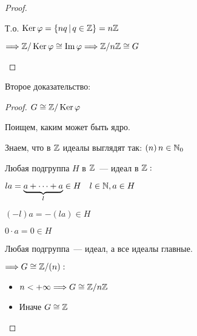 \begin{theorem-non}
\begin{proof}
\begin{enumerate}
            Т.о. $\operatorname{Ker} \varphi = \{ nq \, | \, q \in \mathbb{Z} \} = n \mathbb{Z}$

            $\Longrightarrow \mathbb{Z} / \operatorname{Ker} \varphi \cong \operatorname{Im} \varphi \Longrightarrow \mathbb{Z} / n \mathbb{Z} \cong G$
             
        \end{enumerate}
    \end{proof}

    Второе доказательство:
    \begin{proof}
        
        $G \cong \mathbb{Z} / \operatorname{Ker} \varphi$

        Поищем, каким может быть ядро.

        Знаем, что в $\mathbb{Z}$ идеалы выглядят так: $(n) \, n \in \mathbb{N}_{0}$

        Любая подгруппа $H$ в $\mathbb{Z}$~--- идеал в $\mathbb{Z}:$

        $la = \underbrace{a + \dots + a}_{l} \in H \quad l \in \mathbb{N}, a \in H$

        $(-l)a = -(la) \in H$

        $0 \cdot a = 0 \in H$

        Любая подгруппа~--- идеал, а все идеалы главные.

        $\Longrightarrow G \cong \mathbb{Z} / (n):$
        \begin{itemize}
            \item $n < +\infty \Longrightarrow G \cong \mathbb{Z} / n \mathbb{Z}$
            \item Иначе $G \cong \mathbb{Z}$
        \end{itemize}
    \end{proof}
\end{theorem-non}